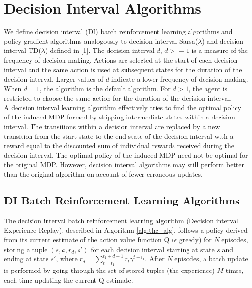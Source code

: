 \documentclass{article}
\begin{document}
\section{Decision Interval Algorithms}
We define decision interval (DI) batch reinforcement learning algorithms and policy gradient algorithms analogously to decision interval Sarsa($\lambda$) and decision interval TD($\lambda$) defined in [1]. The decision interval $d$, $d >= 1$  is a measure of the frequency of decision making. Actions are selected at the start of each decision interval and the same action is used at subsequent states for the duration of the decision interval. Larger values of $d$ indicate a lower frequency of decision making. When $d = 1$, the algorithm is the default algorithm. For $d > 1$, the agent is restricted to choose the same action for the duration of the decision interval.\\
A decision interval learning algorithm effectively tries to find the optimal policy of the induced MDP formed by skipping intermediate states within a decision interval. The transitions within a decision interval are replaced by a new transition from the start state to the end state of the decision interval with a reward equal to the discounted sum of individual rewards received during the decision interval. The optimal policy of the induced MDP need not be optimal for the original MDP. However, decision interval algorithms may still perform better than the original algorithm on account of fewer erroneous updates.

\subsection{DI Batch Reinforcement Learning Algorithms}
The decision interval batch reinforcement learning algorithm (Decision interval Experience Replay), described in Algorithm \ref{alg:the_alg}, follows a policy derived from its current estimate of the action value function Q ($\epsilon$ greedy) for $N$ episodes, storing a tuple $(s, a, r_d, s')$ for each decision interval starting at state $s$ and ending at state $s'$, where $r_d = \sum_{t = t_1}^{t_1 + d - 1} r_t \gamma^{t-t_1}$. After $N$ episodes, a batch update is performed by going through the set of stored tuples (the experience) $M$ times, each time updating the current Q estimate.
\end{document}
